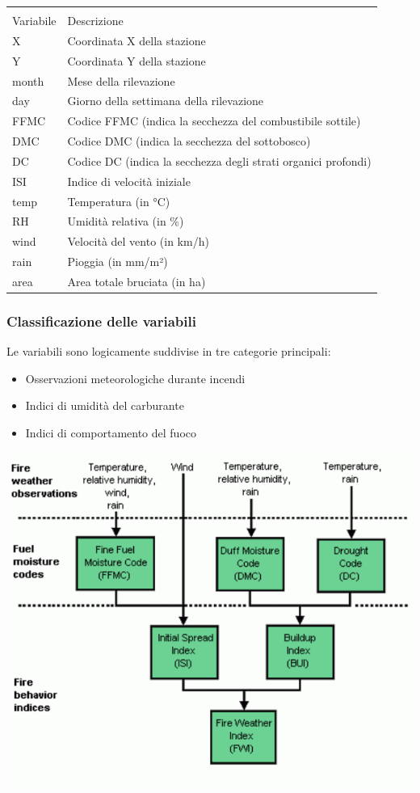 \documentclass[
]{article}
\begin{document}
\begin{table}[H]
\centering
\begin{tabular}[t]{l|l}
\hline
\multicolumn{2}{c}{ } \\

Variabile & Descrizione\\
\hline
X & Coordinata X della stazione\\
\hline
Y & Coordinata Y della stazione\\
\hline
month & Mese della rilevazione\\
\hline
day & Giorno della settimana della rilevazione\\
\hline
FFMC & Codice FFMC (indica la secchezza del combustibile sottile)\\
\hline
DMC & Codice DMC (indica la secchezza del sottobosco)\\
\hline
DC & Codice DC (indica la secchezza degli strati organici profondi)\\
\hline
ISI & Indice di velocità iniziale\\
\hline
temp & Temperatura (in °C)\\
\hline
RH & Umidità relativa (in \%)\\
\hline
wind & Velocità del vento (in km/h)\\
\hline
rain & Pioggia (in mm/m²)\\
\hline
area & Area totale bruciata (in ha)\\
\hline
\end{tabular}
\end{table}

\subsubsection{Classificazione delle
variabili}\label{classificazione-delle-variabili}

Le variabili sono logicamente suddivise in tre categorie principali:

\begin{itemize}
\item
  Osservazioni meteorologiche durante incendi
\item
  Indici di umidità del carburante
\item
  Indici di comportamento del fuoco
\end{itemize}

\begin{center}\includegraphics{ForestFires_files/figure-latex/unnamed-chunk-2-1} \end{center}
\end{document}
